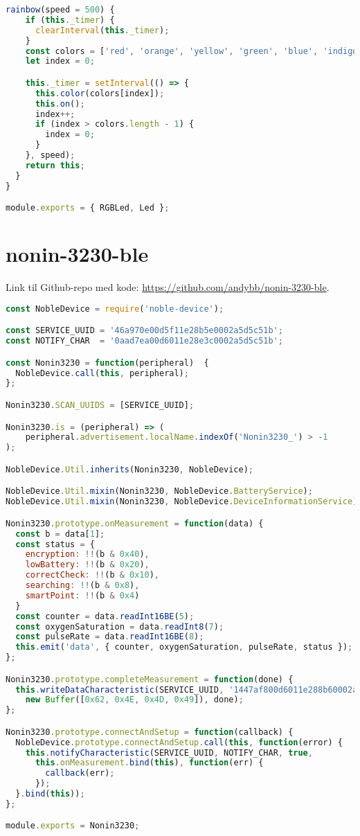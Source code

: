\begin{lstlisting}[frame=single, language=JavaScript,
    caption=pigpio-components: Led classes, label=lst:pigpio-components-led]
  rainbow(speed = 500) {
    if (this._timer) {
      clearInterval(this._timer);
    }
    const colors = ['red', 'orange', 'yellow', 'green', 'blue', 'indigo', 'violet'];
    let index = 0;

    this._timer = setInterval(() => {
      this.color(colors[index]);
      this.on();
      index++;
      if (index > colors.length - 1) {
        index = 0;
      }
    }, speed);
    return this;
  }
}

module.exports = { RGBLed, Led };

\end{lstlisting}

\section{nonin-3230-ble}
Link til Github-repo med kode: \url{https://github.com/andybb/nonin-3230-ble}.

\begin{lstlisting}[frame=single, language=JavaScript,
    caption=Nonin 3230 noble-device library, label=lst:nonin-3230-library]
const NobleDevice = require('noble-device');

const SERVICE_UUID = '46a970e00d5f11e28b5e0002a5d5c51b';
const NOTIFY_CHAR  = '0aad7ea00d6011e28e3c0002a5d5c51b';

const Nonin3230 = function(peripheral)  {
  NobleDevice.call(this, peripheral);
};

Nonin3230.SCAN_UUIDS = [SERVICE_UUID];

Nonin3230.is = (peripheral) => (
    peripheral.advertisement.localName.indexOf('Nonin3230_') > -1
);

NobleDevice.Util.inherits(Nonin3230, NobleDevice);

NobleDevice.Util.mixin(Nonin3230, NobleDevice.BatteryService);
NobleDevice.Util.mixin(Nonin3230, NobleDevice.DeviceInformationService);

Nonin3230.prototype.onMeasurement = function(data) {
  const b = data[1];
  const status = {
    encryption: !!(b & 0x40),
    lowBattery: !!(b & 0x20),
    correctCheck: !!(b & 0x10),
    searching: !!(b & 0x8),
    smartPoint: !!(b & 0x4)
  }
  const counter = data.readInt16BE(5);
  const oxygenSaturation = data.readInt8(7);
  const pulseRate = data.readInt16BE(8);
  this.emit('data', { counter, oxygenSaturation, pulseRate, status });
};

Nonin3230.prototype.completeMeasurement = function(done) {
  this.writeDataCharacteristic(SERVICE_UUID, '1447af800d6011e288b60002a5d5c51b',
    new Buffer([0x62, 0x4E, 0x4D, 0x49]), done);
};

Nonin3230.prototype.connectAndSetup = function(callback) {
  NobleDevice.prototype.connectAndSetup.call(this, function(error) {
    this.notifyCharacteristic(SERVICE_UUID, NOTIFY_CHAR, true,
      this.onMeasurement.bind(this), function(err) {
        callback(err);
      });
  }.bind(this));
};

module.exports = Nonin3230;

\end{lstlisting}


